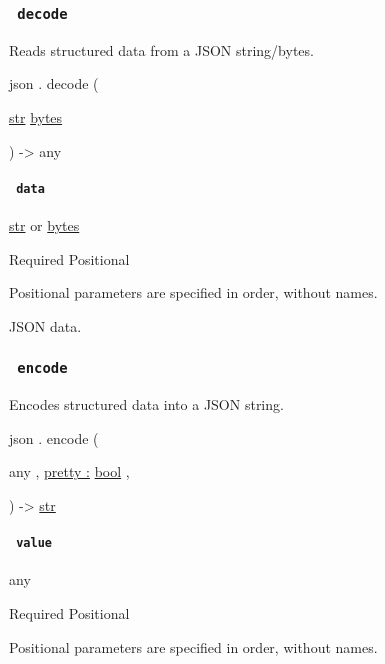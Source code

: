 \subsubsection{\texorpdfstring{\texttt{\ decode\ }}{ decode }}\label{definitions-decode}

Reads structured data from a JSON string/bytes.

json { . } { decode } (

{ \href{/docs/reference/foundations/str/}{str}
\href{/docs/reference/foundations/bytes/}{bytes} }

) -\textgreater{} { any }

\paragraph{\texorpdfstring{\texttt{\ data\ }}{ data }}\label{definitions-decode-data}

\href{/docs/reference/foundations/str/}{str} {or}
\href{/docs/reference/foundations/bytes/}{bytes}

{Required} {{ Positional }}

\label{definitions-decode-data-positional-tooltip}
Positional parameters are specified in order, without names.

JSON data.

\subsubsection{\texorpdfstring{\texttt{\ encode\ }}{ encode }}\label{definitions-encode}

Encodes structured data into a JSON string.

json { . } { encode } (

{ { any } , } { \hyperref[definitions-encode-parameters-pretty]{pretty
:} \href{/docs/reference/foundations/bool/}{bool} , }

) -\textgreater{} \href{/docs/reference/foundations/str/}{str}

\paragraph{\texorpdfstring{\texttt{\ value\ }}{ value }}\label{definitions-encode-value}

{ any }

{Required} {{ Positional }}

\label{definitions-encode-value-positional-tooltip}
Positional parameters are specified in order, without names.

